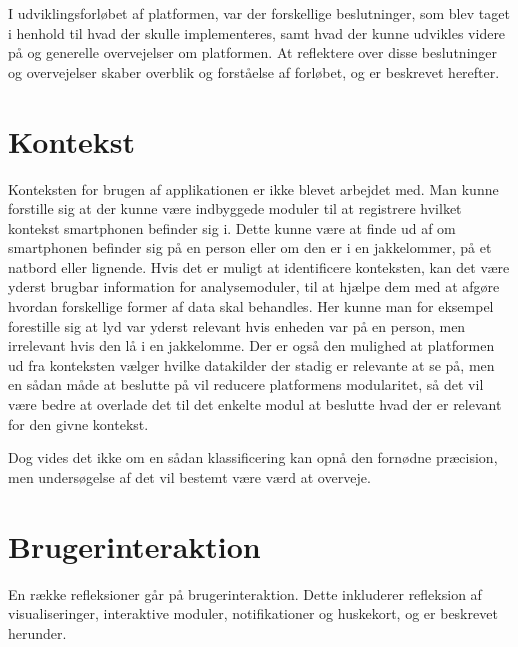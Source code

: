 I udviklingsforløbet af platformen, var der forskellige beslutninger, som blev taget i henhold til hvad der skulle implementeres, samt hvad der kunne udvikles videre på og generelle overvejelser om platformen.
At reflektere over disse beslutninger og overvejelser skaber overblik og forståelse af forløbet, og er beskrevet herefter.


\section{Kontekst}
Konteksten for brugen af applikationen er ikke blevet arbejdet med.
Man kunne forstille sig at der kunne være indbyggede moduler til at registrere hvilket kontekst smartphonen befinder sig i.
Dette kunne være at finde ud af om smartphonen befinder sig på en person eller om den er i en jakkelommer, på et natbord eller lignende.
Hvis det er muligt at identificere konteksten, kan det være yderst brugbar information for analysemoduler, til at hjælpe dem med at afgøre hvordan forskellige former af data skal behandles.
Her kunne man for eksempel forestille sig at lyd var yderst relevant hvis enheden var på en person, men irrelevant hvis den lå i en jakkelomme.
Der er også den mulighed at platformen ud fra konteksten vælger hvilke datakilder der stadig er relevante at se på, men en sådan måde at beslutte på vil reducere platformens modularitet, så det vil være bedre at overlade det til det enkelte modul at beslutte hvad der er relevant for den givne kontekst.

Dog vides det ikke om en sådan klassificering kan opnå den fornødne præcision, men undersøgelse af det vil bestemt være værd at overveje.

\section{Brugerinteraktion}
En række refleksioner går på brugerinteraktion.
Dette inkluderer refleksion af visualiseringer, interaktive moduler, notifikationer og huskekort, og er beskrevet herunder.
